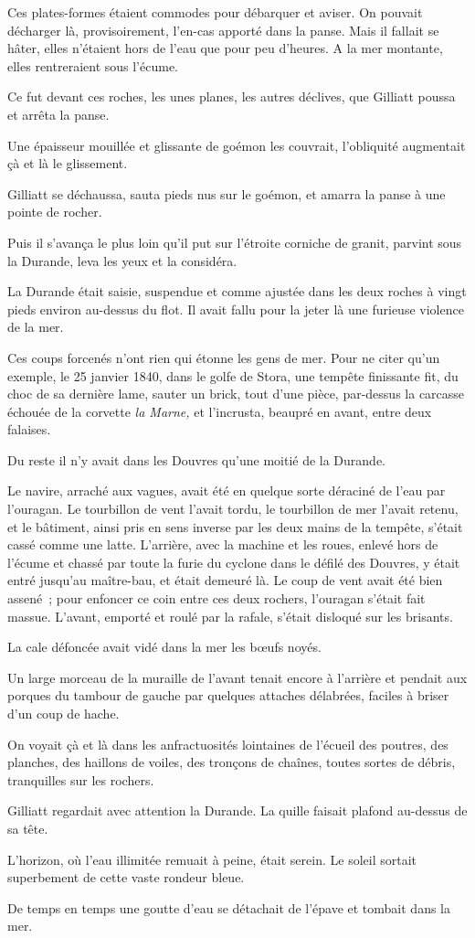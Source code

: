 \documentclass[french,twoside]{book} %
\begin{document}
Ces plates-formes étaient commodes pour débarquer et aviser. On pouvait décharger là, provisoirement, l’en-cas apporté dans la panse. Mais il fallait se hâter, elles n’étaient hors de l’eau que pour peu d’heures. A la mer montante, elles rentreraient sous l’écume.\par
Ce fut devant ces roches, les unes planes, les autres déclives, que Gilliatt poussa et arrêta la panse.\par
Une épaisseur mouillée et glissante de goémon les couvrait, l’obliquité augmentait çà et là le glissement.\par
Gilliatt se déchaussa, sauta pieds nus sur le goémon, et amarra la panse à une pointe de rocher.\par
Puis il s’avança le plus loin qu’il put sur l’étroite  corniche de granit, parvint sous la Durande, leva les yeux et la considéra.\par
La Durande était saisie, suspendue et comme ajustée dans les deux roches à vingt pieds environ au-dessus du flot. Il avait fallu pour la jeter là une furieuse violence de la mer.\par
Ces coups forcenés n’ont rien qui étonne les gens de mer. Pour ne citer qu’un exemple, le 25 janvier 1840, dans le golfe de Stora, une tempête finissante fit, du choc de sa dernière lame, sauter un brick, tout d’une pièce, par-dessus la carcasse échouée de la corvette \emph{la Marne,} et l’incrusta, beaupré en avant, entre deux falaises.\par
Du reste il n’y avait dans les Douvres qu’une moitié de la Durande.\par
Le navire, arraché aux vagues, avait été en quelque sorte déraciné de l’eau par l’ouragan. Le tourbillon de vent l’avait tordu, le tourbillon de mer l’avait retenu, et le bâtiment, ainsi pris en sens inverse par les deux mains de la tempête, s’était cassé comme une latte. L’arrière, avec la machine et les roues, enlevé hors de l’écume et chassé par toute la furie du cyclone dans le défilé des Douvres, y était entré jusqu’au maître-bau, et était demeuré là. Le coup de vent avait été bien assené ; pour enfoncer ce coin entre ces deux rochers, l’ouragan s’était fait massue. L’avant, emporté et roulé par la rafale, s’était disloqué sur les brisants.\par
La cale défoncée avait vidé dans la mer les bœufs noyés.\par
Un large morceau de la muraille de l’avant tenait  encore à l’arrière et pendait aux porques du tambour de gauche par quelques attaches délabrées, faciles à briser d’un coup de hache.\par
On voyait çà et là dans les anfractuosités lointaines de l’écueil des poutres, des planches, des haillons de voiles, des tronçons de chaînes, toutes sortes de débris, tranquilles sur les rochers.\par
Gilliatt regardait avec attention la Durande. La quille faisait plafond au-dessus de sa tête.\par
L’horizon, où l’eau illimitée remuait à peine, était serein. Le soleil sortait superbement de cette vaste rondeur bleue.\par
De temps en temps une goutte d’eau se détachait de l’épave et tombait dans la mer.
\end{document}
